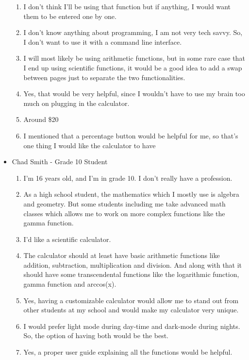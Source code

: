 \documentclass[titlepage]{article}
\begin{document}
\begin{itemize}
\begin{enumerate}
                        \item I don’t think I’ll be using that function but if anything, I would want them to be entered one by one.
                        \item I don’t know anything about programming, I am not very tech savvy. So, I don’t want to use it with a command line interface.
                        \item I will most likely be using arithmetic functions, but in some rare case that I end up using scientific functions, it would be a good idea to add a swap between pages just to separate the two functionalities.
                        \item Yes, that would be very helpful, since I wouldn’t have to use my brain too much on plugging in the calculator.
                        \item Around \$20
                        \item I mentioned that a percentage button would be helpful for me, so that’s one thing I would like the calculator to have
                    \end{enumerate}
                \item Chad Smith - Grade 10 Student
                    \begin{enumerate}
                        \item I'm 16 years old, and I'm in grade 10. I don't really have a profession.
                        \item As a high school student, the mathematics which I mostly use is algebra and geometry. But some students including me take advanced math classes which allows me to work on more complex functions like the gamma function.
                        \item I’d like a scientific calculator.
                        \item The calculator should at least have basic arithmetic functions like addition, subtraction, multiplication and division. And along with that it should have some transcendental functions like the logarithmic function, gamma function and arccos(x).
                        \item Yes, having a customizable calculator would allow me to stand out from other students at my school and would make my calculator very unique.
                        \item I would prefer light mode during day-time and dark-mode during nights. So, the option of having both would be the best.
                        \item Yes, a proper user guide explaining all the functions would be helpful.

\end{enumerate}
\end{itemize}
\end{document}
